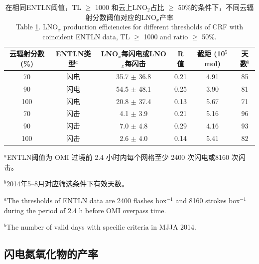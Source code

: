 \begin{table}[htbp]
\caption{在相同ENTLN阈值，TL $\geq$ 1000 和云上LNO$_2$占比 $\geq$ 50\%的条件下，不同云辐射分数阈值对应的LNO$_x$产率 \\
Table \ref{table:CRFs}. LNO$_x$ production efficiencies for different thresholds of CRF with coincident ENTLN data, TL $\geq$ 1000 and ratio $\geq$ 50\%.}
\footnotesize
\begin{tabular}{cccccc}
\hline
云辐射分数 (\%) & ENTLN类型$^a$    & LNO$_x$每闪电或LNO$_x$每闪击
& R值    & 截距 (10$^{5}$mol)  & 天数$^b$ \\
\hline
70  & 闪电  & 35.7  $\pm$ 36.8 & 0.21 & 4.91 & 85 \\
90  & 闪电  & 54.5  $\pm$ 48.1 & 0.25 & 3.90 & 81 \\
100 & 闪电  & 20.8  $\pm$ 37.4 & 0.13 & 5.67 & 71 \\
70  & 闪击 & 4.1   $\pm$ 3.9  & 0.21 & 5.16 & 96 \\
90  & 闪击 & 7.0   $\pm$ 4.8  & 0.29 & 4.16 & 93 \\
100 & 闪击 & 2.6   $\pm$ 4.0  & 0.14 & 5.41 & 82 \\
\hline
\end{tabular}
\begin{tablenotes}
\footnotesize
\item $^a$ENTLN阈值为 OMI 过境前 2.4 小时内每个网格至少 2400 次闪电或8160 次闪击。
\item $^b$2014年5--8月对应筛选条件下有效天数。
\item $^a$The thresholds of ENTLN data are 2400 flashes box$^{-1}$ and 8160 strokes box$^{-1}$ during the period of 2.4 h before OMI overpass time.
\item $^b$The number of valid days with specific criteria in MJJA 2014.
\end{tablenotes}
\label{table:CRFs}
\end{table}

\subsection{闪电氮氧化物的产率}

